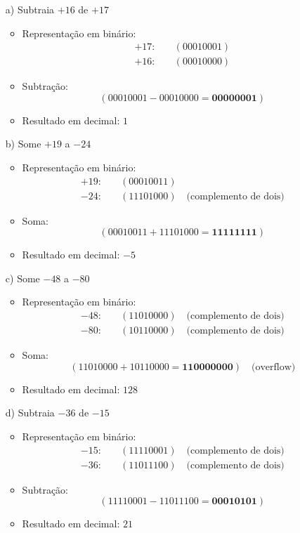 \documentclass[a4paper, 12pt]{article}
\begin{document}
\begin{enumerate}
    \item[a)] Subtraia \(+16\) de \(+17\)
    \begin{itemize}
        \item Representação em binário:
        \begin{align*}
            +17: & \quad (00010001) \\
            +16: & \quad (00010000)
        \end{align*}
        \item Subtração:
        \[
        (00010001 - 00010000 = \mathbf{00000001})
        \]
        \item Resultado em decimal: \(1\)
    \end{itemize}

    \item[b)] Some \(+19\) a \(-24\)
    \begin{itemize}
        \item Representação em binário:
        \begin{align*}
            +19: & \quad (00010011) \\
            -24: & \quad (11101000) \quad \text{(complemento de dois)}
        \end{align*}
        \item Soma:
        \[
        (00010011 + 11101000 = \mathbf{11111111})
        \]
        \item Resultado em decimal: \(-5\)
    \end{itemize}

    \item[c)] Some \(-48\) a \(-80\)
    \begin{itemize}
        \item Representação em binário:
        \begin{align*}
            -48: & \quad (11010000) \quad \text{(complemento de dois)} \\
            -80: & \quad (10110000) \quad \text{(complemento de dois)}
        \end{align*}
        \item Soma:
        \[
        (11010000 + 10110000 = \mathbf{110000000}) \quad \text{(overflow)}
        \]
        \item Resultado em decimal: \(128\) \quad {}
    \end{itemize}

    \item[d)] Subtraia \(-36\) de \(-15\)
    \begin{itemize}
        \item Representação em binário:
        \begin{align*}
            -15: & \quad (11110001) \quad \text{(complemento de dois)} \\
            -36: & \quad (11011100) \quad \text{(complemento de dois)}
        \end{align*}
        \item Subtração:
        \[
        (11110001 - 11011100 = \mathbf{00010101})
        \]
        \item Resultado em decimal: \(21\)
    \end{itemize}


\end{enumerate}
\end{document}
